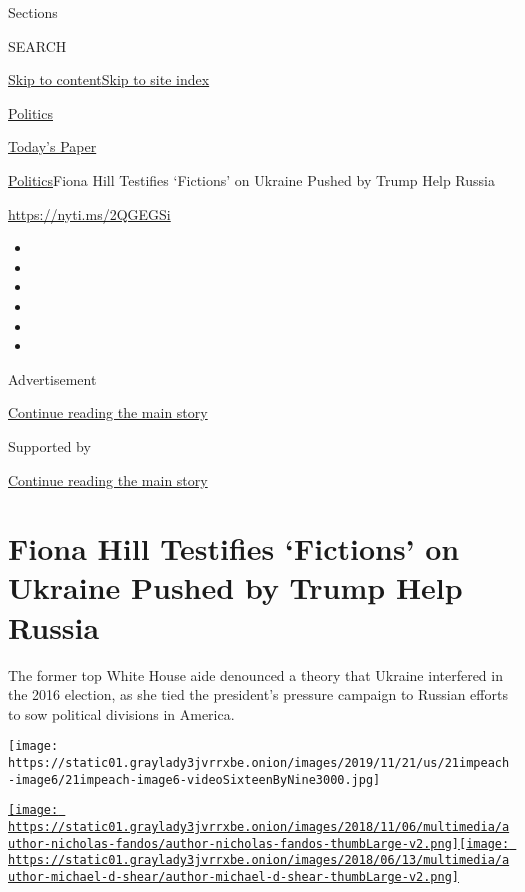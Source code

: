 Sections

SEARCH

\protect\hyperlink{site-content}{Skip to
content}\protect\hyperlink{site-index}{Skip to site index}

\href{https://www.nytimes3xbfgragh.onion/section/politics}{Politics}

\href{https://myaccount.nytimes3xbfgragh.onion/auth/login?response_type=cookie\&client_id=vi}{}

\href{https://www.nytimes3xbfgragh.onion/section/todayspaper}{Today's
Paper}

\href{/section/politics}{Politics}\textbar{}Fiona Hill Testifies
`Fictions' on Ukraine Pushed by Trump Help Russia

\url{https://nyti.ms/2QGEGSi}

\begin{itemize}
\item
\item
\item
\item
\item
\item
\end{itemize}

Advertisement

\protect\hyperlink{after-top}{Continue reading the main story}

Supported by

\protect\hyperlink{after-sponsor}{Continue reading the main story}

\hypertarget{fiona-hill-testifies-fictions-on-ukraine-pushed-by-trump-help-russia}{%
\section{Fiona Hill Testifies `Fictions' on Ukraine Pushed by Trump Help
Russia}\label{fiona-hill-testifies-fictions-on-ukraine-pushed-by-trump-help-russia}}

The former top White House aide denounced a theory that Ukraine
interfered in the 2016 election, as she tied the president's pressure
campaign to Russian efforts to sow political divisions in America.

\texttt{[image: https://static01.graylady3jvrrxbe.onion/images/2019/11/21/us/21impeach-image6/21impeach-image6-videoSixteenByNine3000.jpg]}

\href{https://www.nytimes3xbfgragh.onion/by/nicholas-fandos}{\texttt{[image: https://static01.graylady3jvrrxbe.onion/images/2018/11/06/multimedia/author-nicholas-fandos/author-nicholas-fandos-thumbLarge-v2.png]}}\href{https://www.nytimes3xbfgragh.onion/by/michael-d-shear}{\texttt{[image: https://static01.graylady3jvrrxbe.onion/images/2018/06/13/multimedia/author-michael-d-shear/author-michael-d-shear-thumbLarge-v2.png]}}

